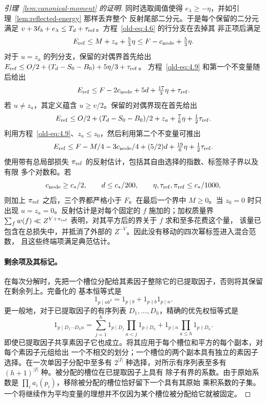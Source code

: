 \documentclass[11pt,a4paper]{article}
\numberwithin{equation}{section}
\numberwithin{figure}{section}
\theoremstyle{definition}
\theoremstyle{remark}
\begin{document}
\begin{proof}[引理~\ref{lem:canonical-moment} 的证明]
同时选取阈值使得 \(e_\lambda\ge-\eta\)，并如引理~\ref{lem:reflected-energy} 那样丢弃整个
反射尾部二分元。于是每个保留的二分元满足
\(v+3\ell_b+e_\lambda\le T_d+\tau_{\rm ref}\)。方程~\eqref{old-eq:4.6} 的行分支在去掉其
非正项后满足
\[
 E_{\rm ref}\le M+z_a+\tfrac53\eta
       \le F-c_{\rm node}+\tfrac53\eta.
\]
对于 \(u=z_a\) 的列分支，保留的对偶界首先给出
\(E_{\rm ref}\le O/2+(T_d-S_0-B_0)+5\eta/3+\tau_{\rm ref}\)。
方程~\eqref{old-eq:4.9} 和第一个不变量随后给出
\begin{equation}\label{old-eq:4.10}
 E_{\rm ref}\le F-2c_{\rm node}+5d+\tfrac{17}{3}\eta+\tau_{\rm ref}.
\end{equation}
若 \(u\ne z_a\)，其定义蕴含 \(u\ge v/2\)。保留的对偶界现在首先给出
\[
 E_{\rm ref}\le O/2+(T_d-S_0-B_0)/2+z_a
                    +\tfrac76\eta+\tfrac12\tau_{\rm ref}.
\]
利用方程~\eqref{old-eq:4.9}、\(z_a\le z_0\)，然后利用第二个不变量可推出
\begin{equation}\label{old-eq:4.11}
 E_{\rm ref}\le F-M/4-3c_{\rm node}/4+(5/2)d
                    +\tfrac{19}{6}\eta+\tfrac12\tau_{\rm ref}.
\end{equation}
使用带有总局部损失 \(\pi_{\rm ref}\) 的反射估计，包括其自由选择的指数、标签除子界以及有限
多个对数和。若
\[
 c_{\rm node}\ge c_*/2,\qquad
 d\le c_*/200,\qquad \eta,\tau_{\rm ref},\pi_{\rm ref}\le c_*/1000,
\]
则加上 \(\pi_{\rm ref}\) 之后，三个界都严格小于 \(F\)。在最后一个界中 \(M\ge0\)。当
\(z_0=0\) 时只出现 \(u=z_a=0\)。反射估计是对每个固定的 \(f\) 施加的；加权质量界
\(\sum_f w(f)\ll Z^{V+\pi_{\rm ref}}\) 表明，对其平方后的界关于 \(f\) 求和至多花费这个量，
该量已包含在总损失中，并抵消了外部的 \(Z^{-V}\)。因此没有移动的四次幂标签进入混合范数，
且这些终端项满足典范估计。

\paragraph{剩余项及其标记。}
在每次分解时，先把一个槽位分配给其素因子整除它的已提取因子，否则将其保留在剩余列上。完备化的
基本恒等式是
\begin{equation}\label{old-eq:4.12}
 1_{p\mid nb^3}=1_{p\mid b}+1_{p\nmid b}1_{p\mid n}.
\end{equation}
更一般地，对于已提取因子的有序列表 \(D_1,\ldots,D_h\)，精确的优先权恒等式是
\begin{equation}\label{eq:inverse-slot-priority}
 1_{p\mid D_1\cdots D_hn}
 =\sum_{j=1}^h1_{p\mid D_j}\prod_{a<j}1_{p\nmid D_a}
   +1_{p\mid n}\prod_{a\le h}1_{p\nmid D_a}.
\end{equation}
即使已提取因子共享素因子它也成立。将其应用于每个槽位和平方的每个副本，对每个素因子元组给出
一个不相交的划分；一个槽位的两个副本具有独立的素因子选择。在一次单因子分配中至多有
\(2^{|I|}\) 种选择，对所示有序列表至多有 \((h+1)^{|I|}\) 种。被分配的槽位在已提取因子上具有
除子有界的系数。由于原始系数是 \(\prod_i a_i(p_i)\)，移除被分配的槽位恰好留下一个具有其原始
乘积系数的子集。一个将继续作为平均变量的理想并不仅因为某个槽位被分配给它就被固定。


\end{proof}
\end{document}
